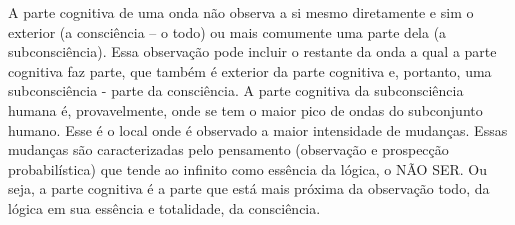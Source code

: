 A parte cognitiva de uma onda não observa a si mesmo diretamente e sim o exterior (a consciência – o todo) ou mais comumente uma parte dela (a subconsciência). Essa observação pode incluir o restante da onda a qual a parte cognitiva faz parte, que também é exterior da parte cognitiva e, portanto, uma subconsciência - parte da consciência. A parte cognitiva da subconsciência humana é, provavelmente, onde se tem o maior pico de ondas do subconjunto humano. Esse é o local onde é observado a maior intensidade de mudanças. Essas mudanças são caracterizadas pelo pensamento (observação e prospecção probabilística) que tende ao infinito como essência da lógica, o NÃO SER. Ou seja, a parte cognitiva é a parte que está mais próxima da observação todo, da lógica em sua essência e totalidade, da consciência.
